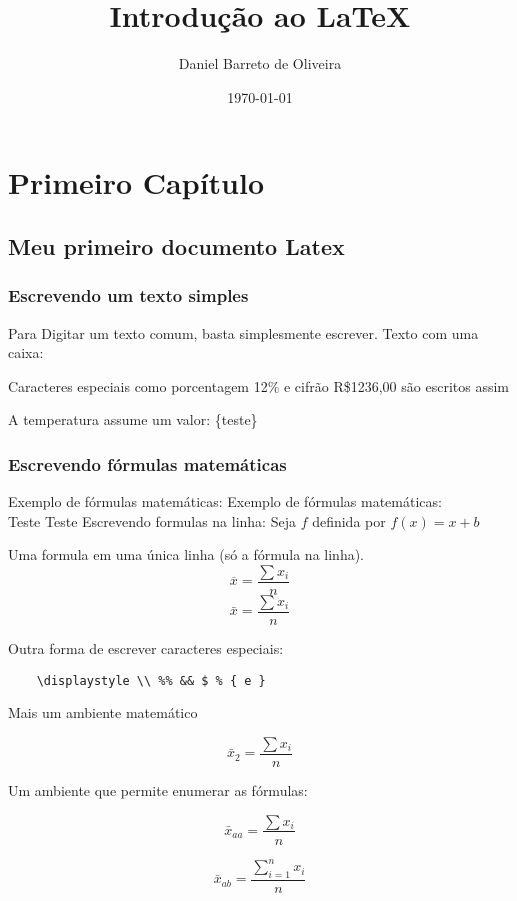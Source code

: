 \documentclass[a4paper, 11pt]{book}  %
\author{Daniel Barreto de Oliveira}
\title{Introdução ao LaTeX}
\date{\today}
\begin{document}
\maketitle
\chapter{Primeiro Capítulo}
\section{Meu primeiro documento Latex}
\subsection{Escrevendo um texto simples}
Para Digitar um texto comum, basta simplesmente escrever.
Texto com uma caixa: 

Caracteres especiais como porcentagem 12\% e cifrão R\$1236,00 são escritos assim

A temperatura assume um valor: \{teste\}


\subsection{Escrevendo fórmulas matemáticas}
Exemplo de fórmulas matemáticas: \newline
Exemplo de fórmulas matemáticas: \\
Teste
Teste
Escrevendo formulas na linha: Seja $f$ definida por $f(x)=x+b$

Uma formula em uma única linha (só a fórmula na linha).
$$\overline{x} = \frac{\sum x_{i}}{n}$$
$$\bar{x} = \frac{\sum x_{i}}{n}$$

Outra forma de escrever caracteres especiais:
\begin{verbatim}
    \displaystyle \\ %% && $ % { e }
\end{verbatim}

Mais um ambiente matemático

\[
    \bar{x}_{2} =   \frac{\sum{x_{i}}}{n}
\]

Um ambiente que permite enumerar as fórmulas:

\begin{equation}
    \bar{x}_{aa} = \frac{\sum{x_{i}}}{n}
    \label{mediaaa}
\end{equation}

\begin{equation}
    \bar{x}_{ab} = \frac{\sum_{i=1}^{n}{x_{i}}}{n}
\end{equation}
\end{document}

